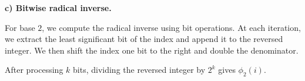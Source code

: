 \textbf{c) Bitwise radical inverse.}

For base $2$, we compute the radical inverse using bit operations.
At each iteration, we extract the least significant bit of the
index and append it to the reversed integer. We then shift the
index one bit to the right and double the denominator.

After processing $k$ bits, dividing the reversed integer by $2^k$
gives $\phi_2(i)$.


